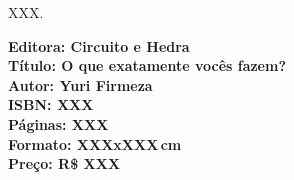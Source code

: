 \noindent{}XXX.

\vfill
\noindent\begin{minipage}[c]{1\linewidth}
{\small\textbf{
\hspace*{-.1cm}Editora: Circuito e Hedra\\
Título: O que exatamente vocês fazem?\\
Autor: Yuri Firmeza\\ 
ISBN: XXX\\
Páginas: XXX\\
Formato: XXXxXXX\,cm\\
Preço: R\$ XXX\\
}}
\end{minipage}
\pagebreak

\vspace*{1.5cm}
\bigskip

\hfill{}
\bigskip
\bigskip
\bigskip

